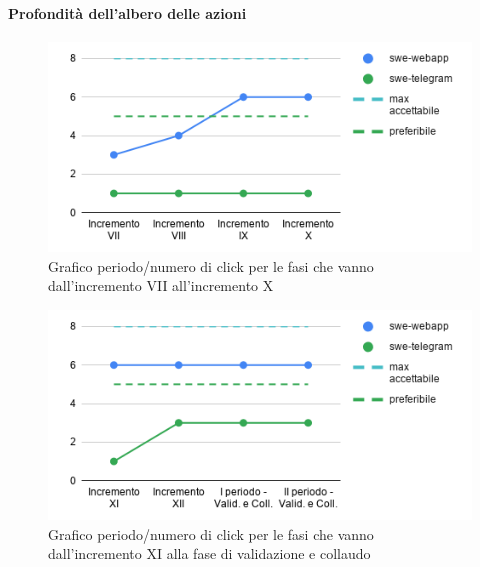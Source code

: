 \paragraph{Profondità dell'albero delle azioni}
	\begin{figure}[H]
			\centering
			\includegraphics[width=0.8\linewidth]{./res/images/QM-PROD-9-PAA.png}
			\caption{Grafico periodo/numero di click per le fasi che vanno dall'incremento VII all'incremento X}
			\label{fig:Grafico periodo/numero di click per le fasi che vanno dall'incremento VII all'incremento X}
	\end{figure}
	\begin{figure}[H]
			\centering
			\includegraphics[width=0.8\linewidth]{./res/images/QM-PROD-9-PAA_1.png}
			\caption{Grafico periodo/numero di click per le fasi che vanno dall'incremento XI alla fase di validazione e collaudo}
			\label{fig:Grafico periodo/numero di click per le fasi che vanno dall'incremento XI alla fase di validazione e collaudo}
	\end{figure}

